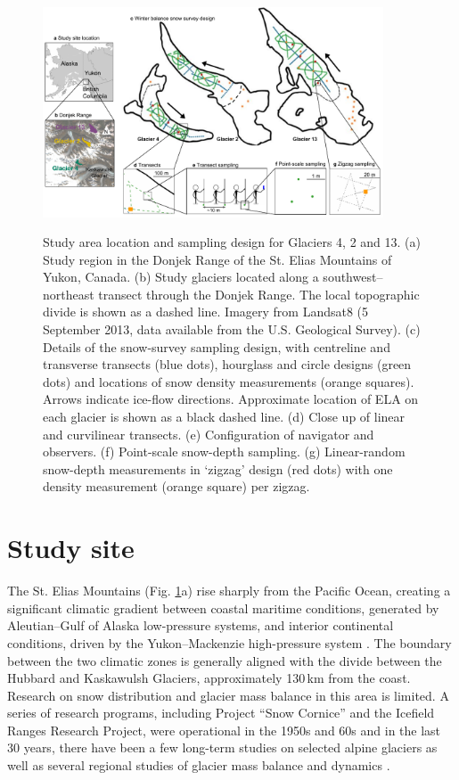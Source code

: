 \documentclass[review,oneside, letterpaper]{igs}
\begin{document}
\begin{figure}
	\centering
	\includegraphics[width =0.9\textwidth]{Sampling.pdf}\\
	\caption{Study area location and sampling design for Glaciers 4, 2 and 13. (a) Study region in the Donjek Range of the St. Elias Mountains of Yukon, Canada. (b) Study glaciers located along a southwest--northeast transect through the Donjek Range. The local topographic divide is shown as a dashed line. Imagery from Landsat8 (5 September 2013, data available from the U.S. Geological Survey). (c) Details of the snow-survey sampling design, with centreline and transverse transects (blue dots), hourglass and circle designs (green dots) and locations of snow density measurements (orange squares). Arrows indicate ice-flow directions. Approximate location of ELA on each glacier is shown as a black dashed line. (d) Close up of linear and curvilinear transects. (e) Configuration of navigator and observers. (f) Point-scale snow-depth sampling. (g) Linear-random snow-depth measurements in `zigzag' design (red dots) with one density measurement (orange square) per zigzag.}
	\label{fig:Sampling}
\end{figure}

\section{Study site}

The St. Elias Mountains (Fig. \ref{fig:Sampling}a) rise sharply from the Pacific Ocean, creating a significant climatic gradient between coastal maritime conditions, generated by Aleutian--Gulf of Alaska low-pressure systems, and interior continental conditions, driven by the Yukon--Mackenzie high-pressure system \citep{Taylor1969}. The boundary between the two climatic zones is generally aligned with the divide between the Hubbard and Kaskawulsh Glaciers, approximately 130\,km from the coast. Research on snow distribution and glacier mass balance in this area is limited. A series of research programs, including Project ``Snow Cornice''  and the Icefield Ranges Research Project, were operational in the 1950s and 60s \citep{Wood1948, Danby2003} and in the last 30 years, there have been a few long-term studies on selected alpine glaciers \citep[e.g.][]{Clarke2014} as well as several regional studies of glacier mass balance and dynamics \citep[e.g.][]{Arendt2008, Berthier2010,Burgess2013,Waechter2015}.
\end{document}
